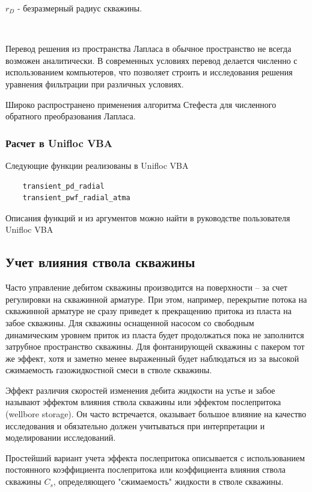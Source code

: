 $r_D$ - безразмерный радиус скважины.

\

Перевод решения из пространства Лапласа в обычное пространство не всегда возможен аналитически. В современных условиях перевод делается численно с использованием компьютеров, что позволяет строить и исследования решения уравнения фильтрации при различных условиях. 

Широко распространено применения алгоритма Стефеста для численного обратного преобразования Лапласа. 

\subsubsection{Расчет в Unifloc VBA}

Следующие функции реализованы в Unifloc VBA

\begin{verbatim}
	transient_pd_radial
	transient_pwf_radial_atma
\end{verbatim}	

Описания функций и из аргументов можно найти в руководстве пользователя  Unifloc VBA

\subsection{Учет влияния ствола скважины}
Часто управление дебитом скважины производится на поверхности -- за счет регулировки на скважинной арматуре. При этом, например, перекрытие потока на скважинной арматуре не сразу приведет к прекращению притока из пласта на забое скважины. Для скважины оснащенной насосом со свободным динамическим уровнем приток из пласта будет продолжаться пока не заполнится затрубное пространство скважины. Для фонтанирующей скважины с пакером тот же эффект, хотя и заметно менее выраженный будет наблюдаться из за высокой сжимаемость газожидкостной смеси в стволе скважины. 

Эффект различия скоростей изменения дебита жидкости на устье и забое называют эффектом влияния ствола скважины или эффектом послепритока (wellbore storage). Он часто встречается, оказывает большое влияние на качество исследования и обязательно должен учитываться при интерпретации и моделировании исследований.

Простейший вариант учета эффекта послепритока описывается с использованием постоянного коэффициента послепритока или коэффициента влияния ствола скважины $C_s$, определяющего "сжимаемость" жидкости в стволе скважины.

